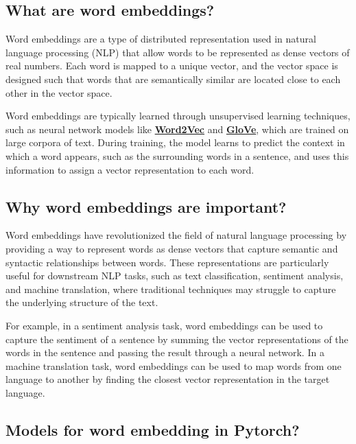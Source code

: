 \subsection{What are word embeddings?}

Word embeddings are a type of distributed representation used in natural language processing (NLP) that allow words to be represented as dense vectors of real numbers. Each word is mapped to a unique vector, and the vector space is designed such that words that are semantically similar are located close to each other in the vector space. \newline

Word embeddings are typically learned through unsupervised learning techniques, such as neural network models like \href{https://arxiv.org/pdf/1301.3781.pdf}{\textbf{Word2Vec}} and \href{https://nlp.stanford.edu/pubs/glove.pdf}{\textbf{GloVe}}, which are trained on large corpora of text. During training, the model learns to predict the context in which a word appears, such as the surrounding words in a sentence, and uses this information to assign a vector representation to each word.

\subsection{Why word embeddings are important?}

Word embeddings have revolutionized the field of natural language processing by providing a way to represent words as dense vectors that capture semantic and syntactic relationships between words. These representations are particularly useful for downstream NLP tasks, such as text classification, sentiment analysis, and machine translation, where traditional techniques may struggle to capture the underlying structure of the text. \newline

For example, in a sentiment analysis task, word embeddings can be used to capture the sentiment of a sentence by summing the vector representations of the words in the sentence and passing the result through a neural network. In a machine translation task, word embeddings can be used to map words from one language to another by finding the closest vector representation in the target language.

\subsection{Models for word embedding in Pytorch?}

